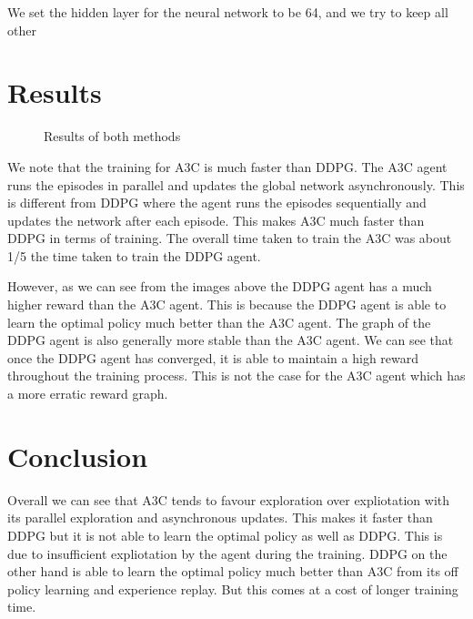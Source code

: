 \documentclass{article}
\begin{document}
We set the hidden layer for the neural network to be 64, and we try to keep
all other

\section*{Results}

\begin{figure}[h]%
    \centering
    \qquad
    \caption{Results of both methods}%
    \label{fig:example}%
\end{figure}

We note that the training for A3C is much faster than DDPG. The A3C agent runs
the episodes in parallel and updates the global network asynchronously. This is
different from DDPG where the agent runs the episodes sequentially and updates
the network after each episode. This makes A3C much faster than DDPG in terms
of training. The overall time taken to train the A3C was about 1/5 the time
taken to train the DDPG agent.

However, as we can see from the images above the DDPG agent has a much higher
reward than the A3C agent. This is because the DDPG agent is able to learn the
optimal policy much better than the A3C agent. The graph of the DDPG agent is
also generally more stable than the A3C agent. We can see that once the DDPG
agent has converged, it is able to maintain a high reward throughout the training
process. This is not the case for the A3C agent which has a more erratic reward
graph.

\section*{Conclusion}

Overall we can see that A3C tends to favour exploration over expliotation with
its parallel exploration and asynchronous updates. This makes it faster than
DDPG but it is not able to learn the optimal policy as well as DDPG. This is
due to insufficient expliotation by the agent during the training. DDPG on the
other hand is able to learn the optimal policy much better than A3C from its
off policy learning and experience replay. But this comes at a cost of longer
training time.
\end{document}

